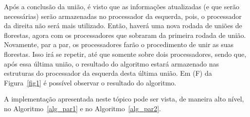 \documentclass[12pt]{article}
\begin{document}
Após a conclusão da união, é visto que as informações atualizadas (e que serão necessárias) serão armazenadas no processador da esquerda, pois, o processador da direita não será mais utilizado. Então, haverá uma nova rodada de uniões de florestas, agora com os processadores que sobraram da primeira rodada de união. Novamente, par a par, os processadores farão o procedimento de unir as suas florestas. Isso irá se repetir, até que somente sobre dois processadores, sendo que, após essa última união, o resultado do algoritmo estará armazenado nas estruturas do processador da esquerda desta última união. Em (F) da Figura~\ref{fig1} é possível observar o resultado do algoritmo.

A implementação apresentada neste tópico pode ser vista, de maneira alto nível, no Algoritmo~\ref{alg_par1} e no Algoritmo~\ref{alg_par2}.
\end{document}
